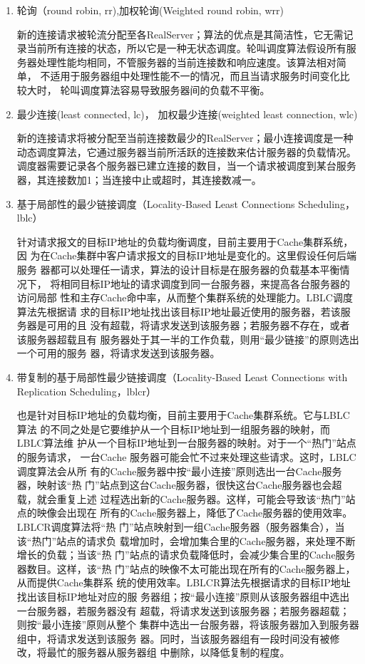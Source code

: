 \begin{enumerate}[itemsep=0pt,parsep=0pt]
\item 轮询（round robin, rr),加权轮询(Weighted round robin, wrr)

  新的连接请求被轮流分配至各RealServer；算法的优点是其简洁性，它无需记
  录当前所有连接的状态，所以它是一种无状态调度。轮叫调度算法假设所有服
  务器处理性能均相同，不管服务器的当前连接数和响应速度。该算法相对简单，
  不适用于服务器组中处理性能不一的情况，而且当请求服务时间变化比较大时，
  轮叫调度算法容易导致服务器间的负载不平衡。

\item 最少连接(least connected, lc)， 加权最少连接(weighted least
  connection, wlc)

  新的连接请求将被分配至当前连接数最少的RealServer；最小连接调度是一种
  动态调度算法，它通过服务器当前所活跃的连接数来估计服务器的负载情况。
  调度器需要记录各个服务器已建立连接的数目，当一个请求被调度到某台服务
  器，其连接数加1；当连接中止或超时，其连接数减一。

\item 基于局部性的最少链接调度（Locality-Based Least Connections
  Scheduling，lblc）

  针对请求报文的目标IP地址的负载均衡调度，目前主要用于Cache集群系统，因
  为在Cache集群中客户请求报文的目标IP地址是变化的。这里假设任何后端服务
  器都可以处理任一请求，算法的设计目标是在服务器的负载基本平衡情况下，
  将相同目标IP地址的请求调度到同一台服务器，来提高各台服务器的访问局部
  性和主存Cache命中率，从而整个集群系统的处理能力。LBLC调度算法先根据请
  求的目标IP地址找出该目标IP地址最近使用的服务器，若该服务器是可用的且
  没有超载，将请求发送到该服务器；若服务器不存在，或者该服务器超载且有
  服务器处于其一半的工作负载，则用“最少链接”的原则选出一个可用的服务
  器，将请求发送到该服务器。

\item 带复制的基于局部性最少链接调度（Locality-Based Least Connections
  with Replication Scheduling，lblcr）

  也是针对目标IP地址的负载均衡，目前主要用于Cache集群系统。它与LBLC算法
  的不同之处是它要维护从一个目标IP地址到一组服务器的映射，而 LBLC算法维
  护从一个目标IP地址到一台服务器的映射。对于一个“热门”站点的服务请求，
  一台Cache 服务器可能会忙不过来处理这些请求。这时，LBLC调度算法会从所
  有的Cache服务器中按“最小连接”原则选出一台Cache服务器，映射该“热
  门”站点到这台Cache服务器，很快这台Cache服务器也会超载，就会重复上述
  过程选出新的Cache服务器。这样，可能会导致该“热门”站点的映像会出现在
  所有的Cache服务器上，降低了Cache服务器的使用效率。LBLCR调度算法将“热
  门”站点映射到一组Cache服务器（服务器集合），当该“热门”站点的请求负
  载增加时，会增加集合里的Cache服务器，来处理不断增长的负载；当该“热
  门”站点的请求负载降低时，会减少集合里的Cache服务器数目。这样，该“热
  门”站点的映像不太可能出现在所有的Cache服务器上，从而提供Cache集群系
  统的使用效率。LBLCR算法先根据请求的目标IP地址找出该目标IP地址对应的服
  务器组；按“最小连接”原则从该服务器组中选出一台服务器，若服务器没有
  超载，将请求发送到该服务器；若服务器超载；则按“最小连接”原则从整个
  集群中选出一台服务器，将该服务器加入到服务器组中，将请求发送到该服务
  器。同时，当该服务器组有一段时间没有被修改，将最忙的服务器从服务器组
  中删除，以降低复制的程度。


\end{enumerate}
